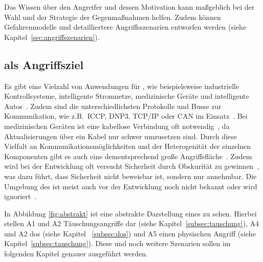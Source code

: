 Das Wissen über den Angreifer und dessen Motivation kann maßgeblich bei der Wahl und der Strategie der Gegenmaßnahmen helfen.
Zudem können Gefahrenmodelle und detailliertere Angriffsszenarien entworfen werden (siehe Kapitel~\ref{sec:angriffszenarien}).


\subsection{ als Angriffsziel}\label{subsec:angriffsziel}



Es gibt eine Vielzahl von Anwendungen für \cps, wie beispielsweise industrielle Kontrollsysteme, intelligente Stromnetze, medizinische Geräte und intelligente Autos~\cite{HLL+17}.
Zudem sind die unterschiedlichsten Protokolle und Busse zur Kommunikation, wie z.B.~ICCP, DNP3, TCP/IP oder CAN im Einsatz~\cite{HLL+17}.
Bei medizinischen Geräten ist eine kabellose Verbindung oft notwendig~\cite{HLL+17}, da Aktualisierungen über ein Kabel nur schwer umzusetzen sind.
Durch diese Vielfalt an Kommunikationsmöglichkeiten und der Heterogenität der einzelnen Komponenten gibt es auch eine dementsprechend große Angriffsfläche~\cite{HLL+17}.
Zudem wird bei der Entwicklung oft versucht Sicherheit durch Obskurität zu gewinnen~\cite{SJT2008}, was dazu führt, dass Sicherheit nicht beweisbar ist, sondern nur annehmbar.
Die Umgebung des \cps ist meist auch vor der Entwicklung noch nicht bekannt oder wird ignoriert~\cite{CAS08,Ericsson2010}.



In Abbildung \ref{fig:abstrakt} ist eine abstrakte Darstellung eines \cps zu sehen.
Hierbei stellen A1 und A2 Täuschungsangriffe dar (siehe Kapitel~\ref{subsec:tauschung}), A4 und A2 \gls{dos} (siehe Kapitel ~\ref{subsec:dos}) und A5 einen physischen Angriff (siehe Kapitel~\ref{subsec:tauschung}).
Diese und noch weitere Szenarien sollen im folgenden Kapitel genauer ausgeführt werden.
